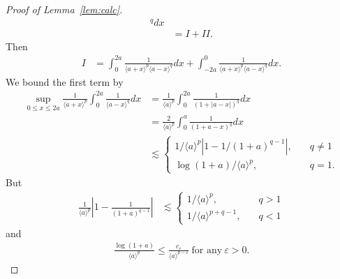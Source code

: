 \documentclass[12pt,reqno]{amsart}
\numberwithin{equation}{section}  %
\numberwithin{figure}{section}
\newcommand{\ee}{\varepsilon}
\begin{document}
\begin{proof}[Proof of Lemma~\ref{lem:calc}]
\begin{equation*}
\begin{split}
{^{q}} d x
\\
& = I + II.
\end{split}
\end{equation*}
%
%
Then
\begin{equation*}
\begin{split}
I 
& = \int_{0}^{2a}
\frac{1}{\langle a + x \rangle ^{p} \langle a - x \rangle
^{q}} d x + \int_{-2a}^{0}
\frac{1}{\langle a + x \rangle ^{p} \langle a - x \rangle
^{q}} d x.
\end{split}
\end{equation*}
We bound the first term by
\begin{equation*}
\begin{split}
\sup_{0 \le x \le 2a} \frac{1}{\langle a + x \rangle
^{p}} \int_{0}^{2a} \frac{1}{\langle a - x \rangle ^{q}} d x
& = \frac{1}{\langle a \rangle ^{p}} \int_{0}^{2a} \frac{1}{(1 + | a -
x
|)^{q}} d x  
\\
& = \frac{2}{\langle a \rangle ^{p}} \int_{0}^{a} \frac{1}{(1 + a -
x)^{q}} d x
\\
& \lesssim
\begin{cases}
1/{\langle a \rangle ^{p}} \left| 1 - 1/{(1 +
a)^{q -1}} \right|, \quad & q \neq 1
\\
\log(1+a)/{\langle a \rangle^{p} }, \quad & q =1.
\end{cases}
\end{split}
\end{equation*}
%
But
%
%
\begin{equation*}
\begin{split}
\frac{1}{\langle a \rangle ^{p}}\left| 1 - \frac{1}{(1 +
a)^{q -1}} \right|
& \lesssim
\begin{cases}
1/{\langle a \rangle^{p} }, \quad & q > 1
\\
1/{\langle a \rangle ^{p + q -1}}, \quad & q < 1
\end{cases}
\end{split}
\end{equation*}
%
%
and
%
%
\begin{equation*}
\begin{split}
\frac{\log(1 + a)}{\langle a \rangle^{p} } \le  \frac{c_{\ee}}{\langle a
\rangle ^{p - \ee}} \ \text{for any} \ \ee > 0.
\end{split}
\end{equation*}


\end{proof}
\end{document}
